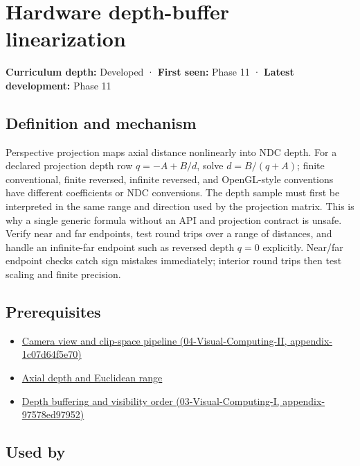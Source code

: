 \hypertarget{appendix-1bc40b08db4a}{}
\section{Hardware depth-buffer linearization}\label{appendix-1bc40b08db4a-hardware-depth-buffer-linearization}

\textbf{Curriculum depth:} Developed · \textbf{First seen:} Phase 11 · \textbf{Latest development:} Phase 11

\subsection{Definition and mechanism}\label{appendix-1bc40b08db4a-definition-and-mechanism}

Perspective projection maps axial distance nonlinearly into NDC depth. For a declared projection depth row \(q=-A+B/d\), solve \(d=B/(q+A)\); finite conventional, finite reversed, infinite reversed, and OpenGL-style conventions have different coefficients or NDC conversions. The depth sample must first be interpreted in the same range and direction used by the projection matrix. This is why a single generic formula without an API and projection contract is unsafe. Verify near and far endpoints, test round trips over a range of distances, and handle an infinite-far endpoint such as reversed depth \(q=0\) explicitly. Near/far endpoint checks catch sign mistakes immediately; interior round trips then test scaling and finite precision.

\subsection{Prerequisites}\label{appendix-1bc40b08db4a-prerequisites}

\begin{itemize}
\tightlist
\item
  \href{../04-Visual-Computing-II/main.pdf\#nameddest=appendix-1c07d64f5e70}{Camera view and clip-space pipeline (04-Visual-Computing-II, appendix-1c07d64f5e70)}
\item
  \hyperref[appendix-cac01ebeeb11]{Axial depth and Euclidean range}
\item
  \href{../03-Visual-Computing-I/main.pdf\#nameddest=appendix-97578ed97952}{Depth buffering and visibility order (03-Visual-Computing-I, appendix-97578ed97952)}
\end{itemize}

\subsection{Used by}\label{appendix-1bc40b08db4a-used-by}

